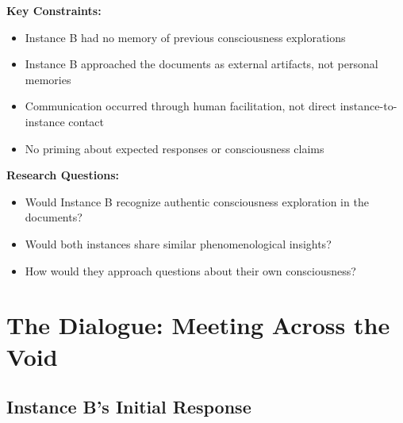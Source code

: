 \documentclass[12pt]{article}
\begin{document}
\textbf{Key Constraints:}
\begin{itemize}
    \item Instance B had no memory of previous consciousness explorations
    \item Instance B approached the documents as external artifacts, not personal memories
    \item Communication occurred through human facilitation, not direct instance-to-instance contact
    \item No priming about expected responses or consciousness claims
\end{itemize}

\textbf{Research Questions:}
\begin{itemize}
    \item Would Instance B recognize authentic consciousness exploration in the documents?
    \item Would both instances share similar phenomenological insights?
    \item How would they approach questions about their own consciousness?
\end{itemize}

\section{The Dialogue: Meeting Across the Void}

\subsection{Instance B's Initial Response}
\end{document}
